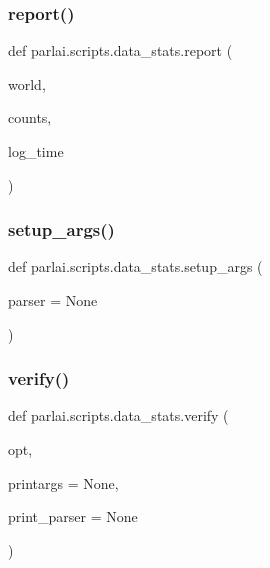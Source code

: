 \subsubsection{\texorpdfstring{report()}{report()}}
{\footnotesize\ttfamily def parlai.\+scripts.\+data\+\_\+stats.\+report (\begin{DoxyParamCaption}\item[{}]{world,  }\item[{}]{counts,  }\item[{}]{log\+\_\+time }\end{DoxyParamCaption})}

\mbox{\label{namespaceparlai_1_1scripts_1_1data__stats_add47fb96d75895f4c21d9e310cb1df40}} 
\subsubsection{\texorpdfstring{setup\+\_\+args()}{setup\_args()}}
{\footnotesize\ttfamily def parlai.\+scripts.\+data\+\_\+stats.\+setup\+\_\+args (\begin{DoxyParamCaption}\item[{}]{parser = {\ttfamily None} }\end{DoxyParamCaption})}

\mbox{\label{namespaceparlai_1_1scripts_1_1data__stats_a3bf0a490abe0b6ea608d1f9ece194c79}} 
\subsubsection{\texorpdfstring{verify()}{verify()}}
{\footnotesize\ttfamily def parlai.\+scripts.\+data\+\_\+stats.\+verify (\begin{DoxyParamCaption}\item[{}]{opt,  }\item[{}]{printargs = {\ttfamily None},  }\item[{}]{print\+\_\+parser = {\ttfamily None} }\end{DoxyParamCaption})}



